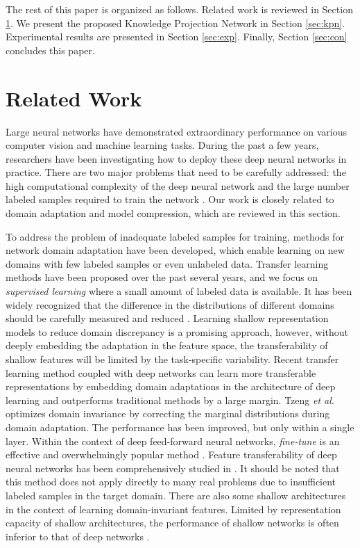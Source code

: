 \documentclass[journal]{IEEEtran}
\newcommand{\etal}{\textit{et al}. }
\begin{document}
The rest of this paper is organized as follows. Related work is reviewed in Section \ref{sec:related}. We present the proposed Knowledge Projection Network in Section \ref{sec:kpn}. Experimental results are presented in Section \ref{sec:exp}. Finally, Section \ref{sec:con} concludes this paper.

\section{Related Work}
\label{sec:related}
Large neural networks have demonstrated extraordinary performance on various computer vision and machine learning tasks. During the past a few years, researchers have been 
investigating how to deploy these deep neural networks in practice.
There are two major problems that need to be carefully addressed: the high computational complexity of the deep neural network and the large number labeled samples required to train the network \cite{kim2009configurable, sudha2011self}.  
Our work is closely related to domain adaptation and model compression, which are reviewed in this section.

To address  the problem of inadequate labeled samples for training, methods for network domain adaptation \cite{pan2010survey, wang2014flexible, long2015learning}
have been developed, which enable learning on new domains with few labeled samples or even unlabeled data. Transfer learning methods have been proposed over the past several years, and we focus on \textit{supervised learning} where a small amount of labeled data is available. It has been  widely recognized that the difference in the distributions of different domains should be carefully measured and reduced \cite{long2015learning}. Learning shallow representation models to reduce domain discrepancy is a promising approach, however, without deeply embedding the adaptation in the feature space, the transferability of shallow features will be limited by the task-specific variability. Recent transfer learning method coupled with deep networks can learn more transferable representations by embedding domain adaptations in the architecture of deep learning \cite{ganin2014unsupervised} and outperforms traditional methods by a large margin. Tzeng \etal \cite{tzeng2015simultaneous} optimizes domain invariance by correcting the marginal distributions during domain adaptation. The performance has been improved, but only within a single layer. Within the context of deep feed-forward neural networks, \textit{fine-tune} is an effective and overwhelmingly popular method \cite{zeiler2014visualizing, oquab2014learning}. Feature transferability of deep neural networks has been comprehensively studied in \cite{yosinski2014transferable}. It should be noted  that this method does not apply directly to many real problems due to insufficient labeled samples in the target domain. There are also some shallow architectures \cite{ajakan2014domain, ghifary2014domain} in the context of learning domain-invariant features. Limited by representation capacity of shallow architectures, the performance of shallow networks is often inferior to that 
of deep networks \cite{long2015learning}. 
\end{document}
